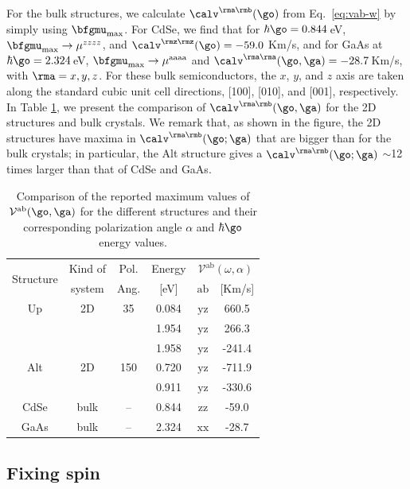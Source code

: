 \documentclass[floatfix,prb,aps,superscriptaddress,showpacs,11pt,preprint,letterpaper]{revtex4}
\begin{document}
For the bulk structures, we calculate $\calv^{\rma\rmb}(\go)$ from
Eq.~\eqref{eq:vab-w} by simply using $\bfgmu_{\mathrm{max}}$. For CdSe, we find
that for $\hbar\go=0.844$\,eV, $\bfgmu_{\mathrm{max}}\to \mu^{zzzz}$, and
$\calv^{\rmz\rmz}(\go)=-59.0$ Km/s, and for GaAs at $\hbar\go=2.324$\,eV,
$\bfgmu_{\mathrm{max}}\to\mu^{\mathrm{aaaa}}$ and $\calv^{\rma\rma}(\go,\ga)=-28.7$\,Km/s, with
$\rma=x,y,z$. For these bulk semiconductors, the $x$, $y$, and $z$ axis are
taken along the standard cubic unit cell directions, [100], [010], and [001],
respectively. In Table \ref{tab:vab-str-comp}, we present the comparison of
$\calv^{\rma\rmb}(\go,\ga)$ for the 2D structures and bulk crystals.
% 
We remark that, as shown in the figure, 
the 2D structures have maxima in 
$\calv^{\rma\rmb}(\go;\ga)$  
that are bigger
than for the bulk crystals; in particular, the Alt
structure gives a $\calv^{\rma\rmb}(\go;\ga)$ $\sim$12 times larger than
that of CdSe and GaAs.
\begin{table}%
\begin{tabular}{cccccc}
\hline
\multirow{2}{*}{Structure \quad} & 
Kind of \quad & 
Pol. &
Energy & 
\multicolumn{2}{c}{$\mathcal{V}^{\mathrm{ab}}(\omega,\alpha)$}\\
\cline{5-6}
& system & Ang. & [eV] & $\mathrm{ab}$ \quad & [Km/s]\\
\hline
Up    & 2D   & 35    & 0.084  & $\mathrm{yz}$ &  660.5 \\
      &      &       & 1.954  & $\mathrm{yz}$ &  266.3 \\
      &      &       & 1.958  & $\mathrm{yz}$ & -241.4 \\
Alt   & 2D   & 150   & 0.720  & $\mathrm{yz}$ & -711.9 \\
      &      &       & 0.911  & $\mathrm{yz}$ & -330.6 \\
CdSe  & bulk & --    & 0.844  & $\mathrm{zz}$ &  -59.0 \\
GaAs  & bulk & --    & 2.324  & $\mathrm{xx}$ &  -28.7 \\
\hline
\end{tabular}
\caption{Comparison of the reported maximum values of
$\mathcal{V}^{\mathrm{ab}}(\go,\ga)$ for the different structures and their
corresponding polarization angle $\alpha$ and $\hbar\go$ energy values.
}
\label{tab:vab-str-comp}
\end{table}



\subsection{Fixing spin} %
\label{sec:res-fixspin}
\end{document}
